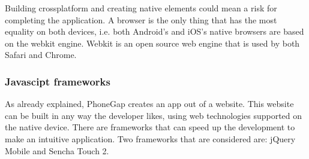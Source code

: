 Building crossplatform and creating native elements could mean a risk for completing the application. A browser is the only thing that has the most equality on both devices, i.e. both Android's and iOS's native browsers are based on the webkit engine\cite{webkit}. Webkit is an open source web engine that is used by both Safari and Chrome.

\subsubsection*{Javascipt frameworks}
As already explained, PhoneGap creates an app out of a website. This website can be built in any way the developer likes, using web technologies supported on the native device. There are frameworks that can speed up the development to make an intuitive application. Two frameworks that are considered are: jQuery Mobile \cite{jQuery-Mobile} and  Sencha Touch 2\cite{sencha}. 

